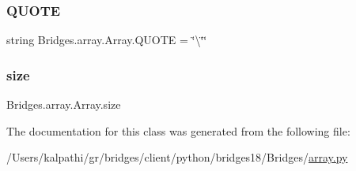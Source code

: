 \mbox{\label{class_bridges_1_1array_1_1_array_ab951298b5e08d36d671ac2ebb2ec21f0}} 
\subsubsection{\texorpdfstring{Q\+U\+O\+TE}{QUOTE}}
{\footnotesize\ttfamily string Bridges.\+array.\+Array.\+Q\+U\+O\+TE = \char`\"{}\textbackslash{}\char`\"{}\char`\"{}\hspace{0.3cm}{\ttfamily [static]}}

\mbox{\label{class_bridges_1_1array_1_1_array_a9f23993cd6d215880b0c126d459f05d2}} 
\subsubsection{\texorpdfstring{size}{size}}
{\footnotesize\ttfamily Bridges.\+array.\+Array.\+size}



The documentation for this class was generated from the following file\+:\begin{DoxyCompactItemize}
\item 
/\+Users/kalpathi/gr/bridges/client/python/bridges18/\+Bridges/\mbox{\hyperlink{array_8py}{array.\+py}}\end{DoxyCompactItemize}
